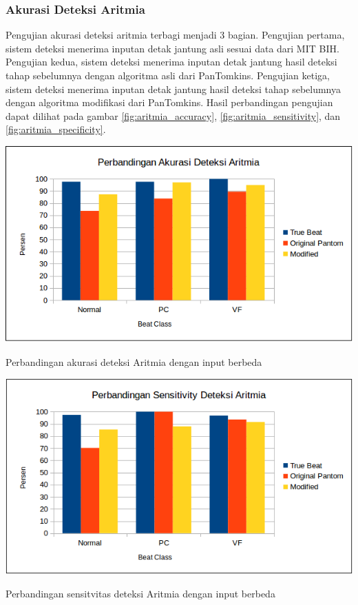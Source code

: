 \subsubsection{Akurasi Deteksi Aritmia}
Pengujian akurasi deteksi aritmia terbagi menjadi 3 bagian. Pengujian pertama, sistem deteksi menerima inputan detak jantung asli sesuai data dari MIT BIH. Pengujian kedua, sistem deteksi menerima inputan detak jantung hasil deteksi tahap sebelumnya dengan algoritma asli dari PanTomkins. Pengujian ketiga, sistem deteksi menerima inputan detak jantung hasil deteksi tahap sebelumnya dengan algoritma modifikasi dari PanTomkins. Hasil perbandingan pengujian dapat dilihat pada gambar \ref{fig:aritmia_accuracy}, \ref{fig:aritmia_sensitivity}, dan \ref{fig:aritmia_specificity}.

\begin{table}[H]
	\centering
	\includegraphics[scale=0.7]{images/aritmia_acc.png}
	\caption{Perbandingan akurasi deteksi Aritmia dengan input berbeda}
	\label{fig:aritmia_accuracy}
\end{table}
\begin{table}[H]
	\centering
	\includegraphics[scale=0.7]{images/aritmia_se.png}
	\caption{Perbandingan sensitvitas deteksi Aritmia dengan input berbeda}
	\label{fig:aritmia_sensitivity}
\end{table}
